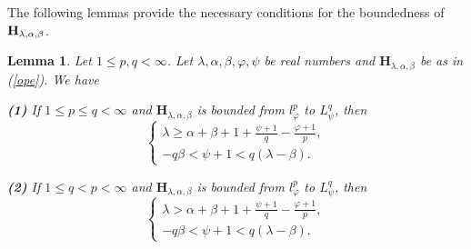 \documentclass[10pt]{amsart}
\newtheorem{lemma}[theorem]{Lemma}
\theoremstyle{definition}    %
\numberwithin{equation}{section}
\begin{document}
The following lemmas provide the necessary conditions for the boundedness of ${\bf H}_{\lambda, \alpha, \beta}$.
\begin{lemma}\label{ll-4-1}
Let $1\leq p, q<\infty$. Let $\lambda, \alpha, \beta, \varphi, \psi$ be real numbers and $\mathbf{H}_{\lambda, \alpha, \beta}$ be as in (\ref{ope}). We have

{\bf (1)} If $1\leq p\leq q<\infty$ and $\mathbf{H}_{\lambda, \alpha, \beta}$ is bounded from 
$l_{\varphi}^p$ to $L_{\psi}^q$, then 
\begin{equation} 
\begin{cases}
\lambda\geq \alpha+\beta+1+\frac{\psi+1}{q}-\frac{\varphi+1}{p}, \\
-q\beta<\psi+1<q(\lambda-\beta). \nonumber 
\end{cases}
\end{equation}

{\bf (2)} If $1\leq q<p<\infty$ and $\mathbf{H}_{\lambda, \alpha, \beta}$ is bounded from 
$l_{\varphi}^p$ to $L_{\psi}^q$, then 
\begin{equation} 
\begin{cases}
\lambda>\alpha+\beta+1+\frac{\psi+1}{q}-\frac{\varphi+1}{p}, \\
-q\beta<\psi+1<q(\lambda-\beta). \nonumber 
\end{cases}
\end{equation}
\end{lemma}
 
\end{document}
